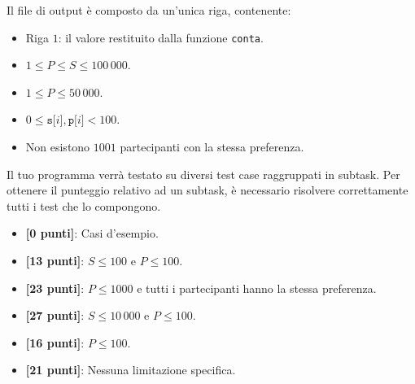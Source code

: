 Il file di output è composto da un'unica riga, contenente:
\begin{itemize}[nolistsep,itemsep=2mm]
\item Riga $1$: il valore restituito dalla funzione \texttt{conta}.
\end{itemize}



\Constraints

\begin{itemize}[nolistsep, itemsep=2mm]
	\item $1 \le P \le S \le 100\,000$.
	\item $1 \le P \le 50\,000$.
	\item $0 \le \texttt{s[$i$]}, \texttt{p[$i$]} < 100$.
	\item Non esistono $1001$ partecipanti con la stessa preferenza.
\end{itemize}



\Scoring

Il tuo programma verrà testato su diversi test case raggruppati in subtask.
Per ottenere il punteggio relativo ad un subtask, è necessario risolvere correttamente tutti i test che lo compongono.

\begin{itemize}[nolistsep,itemsep=2mm]
  \item \textbf{ [\phantom{1}0 punti]}: Casi d'esempio.
  \item \textbf{ [13 punti]}: $S \leq 100$ e $P\le 100$. %
  \item \textbf{ [23 punti]}: $P\le 1000$ e tutti i partecipanti hanno la stessa preferenza.
  \item \textbf{ [27 punti]}: $S \leq 10\,000$ e $P \le 100$. %
  \item \textbf{ [16 punti]}: $P\le 100$. %
  \item \textbf{ [21 punti]}: Nessuna limitazione specifica. %
\end{itemize}

